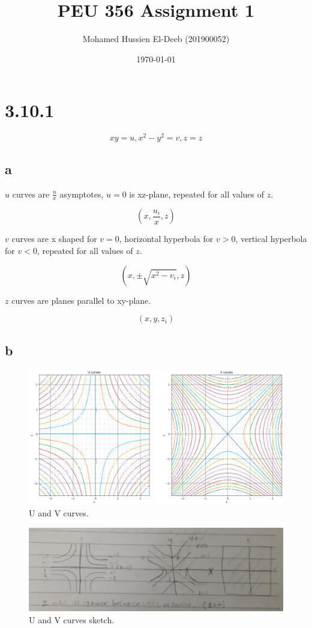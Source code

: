 \documentclass[12pt]{article}
\title{PEU 356 Assignment 1}
\author{Mohamed Hussien El-Deeb (201900052)}
\date{\today}
\begin{document}
\maketitle
\tableofcontents

\section{3.10.1}

\[
    xy = u, x^2 - y^2 = v, z = z
\]

\subsection{a}

\(u\) curves are \(\frac{n}{x}\) asymptotes, \(u=0\) is xz-plane, repeated for all values of \(z\).

\[
    (x, \frac{u_i}{x}, z)
\]

\(v\) curves are x shaped for \(v=0\), horizontal hyperbola for \(v>0\), vertical hyperbola for \(v<0\), repeated for all values of \(z\).

\[
    (x, \pm\sqrt{x^2 - v_i}, z)
\]

\(z\) curves are planes parallel to xy-plane.


\[
    (x, y, z_i)
\]

\subsection{b}

\begin{figure}[H]
    \includegraphics[width=\linewidth]{Q1B.png}
    \caption{U and V curves.}\label{fig:Q1B}
\end{figure}

\begin{figure}[H]
    \includegraphics[width=\linewidth]{Q1B.jpg}
    \caption{U and V curves sketch.}\label{fig:Q1B2}
\end{figure}
\end{document}
